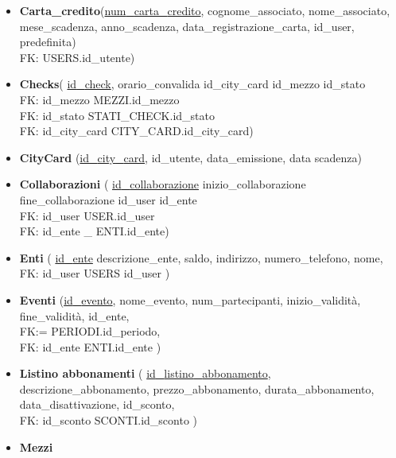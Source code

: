 \begin{itemize}
    \item 
    \textbf{Carta{\_}credito}(\underline{num{\_}carta{\_}credito}, cognome{\_}associato, nome{\_}associato,
    mese{\_}scadenza, anno{\_}scadenza, data{\_}registrazione{\_}carta, id{\_}user,
    predefinita)\\
    FK: USERS.id{\_}utente)
    \item 
    \textbf{Checks}(
    \underline{id{\_}check}, 
    orario{\_}convalida
    id{\_}city{\_}card
    id{\_}mezzo
    id{\_}stato\\
    FK: id{\_}mezzo \textrightarrow MEZZI.id{\_}mezzo\\
    FK: id{\_}stato \textrightarrow STATI{\_}CHECK.id{\_}stato\\
    FK: id{\_}city{\_}card \textrightarrow CITY{\_}CARD.id{\_}city{\_}card)\\
    \item 
    \textbf{CityCard}
    (\underline{id{\_}city{\_}card},
    id{\_}utente,
    data{\_}emissione,
    data scadenza)
    \item 
    \textbf{Collaborazioni}
    (
    \underline{id{\_}collaborazione}
    inizio{\_}collaborazione
    fine{\_}collaborazione
    id{\_}user
    id{\_}ente\\
    FK: id{\_}user \textrightarrow USER.id{\_}user\\
    FK: id{\_}ente {\_} \textrightarrow ENTI.id{\_}ente)
    \item
    \textbf{Enti}
    (
    \underline{id{\_}ente}
    descrizione{\_}ente,
    saldo,
    indirizzo,
    numero{\_}telefono,
    nome,\\
    FK: id{\_}user \textrightarrow USERS id{\_}user
    )
    \item 
    \textbf{Eventi}
    (\underline{id{\_}evento},
    nome{\_}evento,
    num{\_}partecipanti,
    inizio{\_}validità,
    fine{\_}validità,
    id{\_}ente,\\
    FK:= PERIODI.id{\_}periodo,\\
    FK: id{\_}ente \textrightarrow ENTI.id{\_}ente
    )
    \item 
    \textbf{Listino abbonamenti}
    (
    \underline{id{\_}listino{\_}abbonamento},
    descrizione{\_}abbonamento,
    prezzo{\_}abbonamento,
    durata{\_}abbonamento,
    data{\_}disattivazione,
    id{\_}sconto,\\
    FK: id{\_}sconto \textrightarrow SCONTI.id{\_}sconto
    )
    \item 
    \textbf{Mezzi}

\end{itemize}
